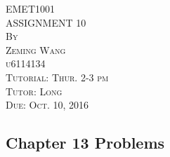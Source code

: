 \documentclass{article}
\begin{document}




\thispagestyle{empty}

\begin{center}
\huge
\vspace*{1.0in} EMET1001 
\\\vspace{0.5in} ASSIGNMENT 10
\normalsize
\\\vspace{0.5in} \textsc{By}
\\\vspace{0.1in} \textsc{Zeming Wang}
\\\vspace{0.1in} \textsc{u6114134}
\normalsize
\\\vspace{0.5in} \textsc{Tutorial: Thur. 2-3 pm}
\\\vspace{0.1in} \textsc{Tutor: Long}
\normalsize
\\\vspace{0.5in} \textsc{Due: Oct. 10, 2016}
\end{center}

\newpage
\setcounter{page}{1}

\subsection*{Chapter 13 Problems}
\vspace{0.1in}
\end{document}
